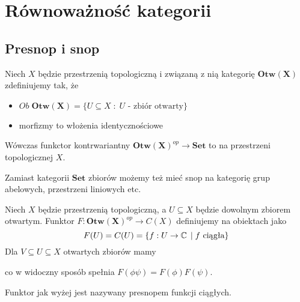 \section{Równoważność kategorii}

\subsection{Presnop i snop}

  Niech $X$ będzie przestrzenią topologiczną i związaną z nią kategorię $\mathbf{Otw(X)}$ zdefiniujemy tak, że
  \begin{itemize}
    \item $Ob\;\mathbf{Otw(X)}=\{U\subseteq X\;:\;U\text{ - zbiór otwarty}\}$
    \item morfizmy to włożenia identycznościowe
  \end{itemize}
  Wówczas funkctor kontrwariantny $\mathbf{Otw(X)}^{op}\to \mathbf{Set}$ to  na przestrzeni topologicznej $X$.

Zamiast kategorii $\mathbf{Set}$ zbiorów możemy też mieć snop na kategorię grup abelowych, przestrzeni liniowych etc.

\begin{example}
\item Niech $X$ będzie przestrzenią topologiczną, a $U\subseteq X$ będzie dowolnym zbiorem otwartym. Funktor $F:\mathbf{Otw(X)}^{op}\to {C(X)}$ definiujemy na obiektach jako
  $$F(U)=C(U)=\{f:U\to\operatorname{\mathbb{C}}\;|\;f\text{ ciągła}\}$$
  Dla $V\subseteq U\subseteq X$ otwartych zbiorów mamy

  \begin{center}
  \end{center}

  co w widoczny sposób spełnia $F(\phi\psi)=F(\phi)F(\psi)$.

  Funktor jak wyżej jest nazywany presnopem funkcji ciągłych.
\end{example}

